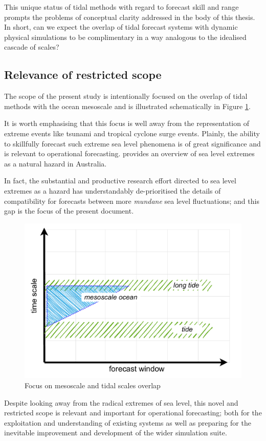 This unique status of tidal methods with regard to forecast skill and range prompts the problems of conceptual clarity addressed in the body of this thesis.  In short, can we expect the overlap of tidal forecast systems with dynamic physical simulations to be complimentary in a way analogous to the idealised cascade of scales?
\subsection{Relevance of restricted scope}
The scope of the present study is intentionally focused on the overlap of tidal methods with the ocean mesoscale and is illustrated schematically in Figure \ref{fig:forecastScalesFocus}.

It is worth emphasising that this focus is well away from the representation of extreme events like tsunami and tropical cyclone surge events.   Plainly, the ability to skillfully forecast such extreme sea level phenomena is of great significance and is relevant to operational forecasting. \citet{McInnes:2016km} provides an overview of sea level extremes as a natural hazard in Australia.    

In fact, the substantial and productive research effort directed to sea level extremes as a hazard has understandably de-prioritised the details of compatibility for forecasts between more \emph{mundane} sea level fluctuations; and this gap is the focus of the present document. 

\begin{figure}[H]\centering
  \includegraphics[width=\figwidthBig]{figures/diagrams/scales_focus.pdf}
  \caption{Focus on mesoscale and tidal scales overlap}
  \label{fig:forecastScalesFocus}
\end{figure}
Despite looking away from the radical extremes of sea level, this novel and restricted scope is relevant and important for operational forecasting; both for the exploitation and understanding of existing systems as well as preparing for the inevitable improvement and development of the wider simulation suite. 
